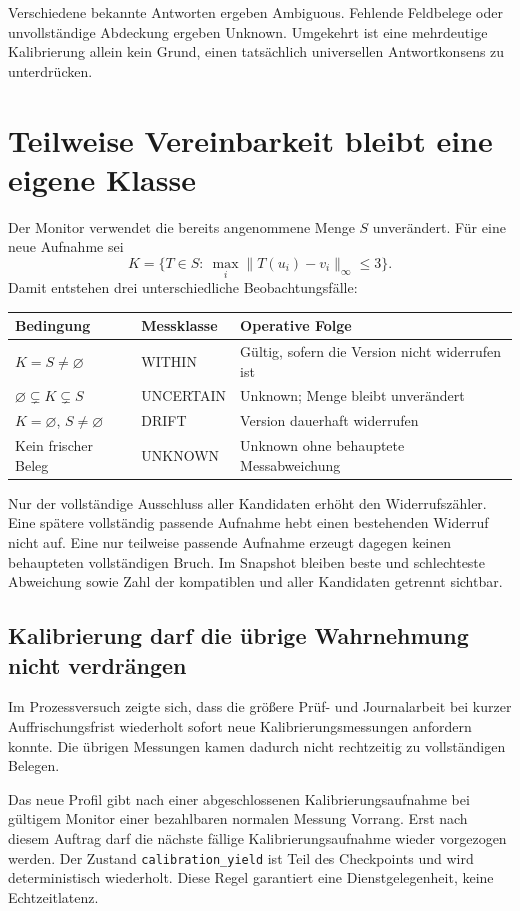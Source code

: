 \documentclass[11pt,a4paper]{article}
\newcommand{\nextsection}[2]{\clearpage{\color{accent}\small\textsf{#1}}\section{#2}}
\begin{document}
Verschiedene bekannte Antworten ergeben Ambiguous. Fehlende
Feldbelege oder unvollständige Abdeckung ergeben Unknown.
Umgekehrt ist eine mehrdeutige Kalibrierung allein kein Grund,
einen tatsächlich universellen Antwortkonsens zu unterdrücken.

\nextsection{64 / MONITOR UND MESSPLAN}{Teilweise Vereinbarkeit bleibt eine eigene Klasse}
Der Monitor verwendet die bereits angenommene Menge $S$ unverändert.
Für eine neue Aufnahme sei
\[
 K=\{T\in S:\ \max_i\|T(u_i)-v_i\|_\infty\leq3\}.
\]
Damit entstehen drei unterschiedliche Beobachtungsfälle:

\begin{tabularx}{\linewidth}{@{}l l Y@{}}
\toprule
Bedingung & Messklasse & Operative Folge\\\midrule
$K=S\ne\varnothing$ & WITHIN & Gültig, sofern die Version nicht widerrufen ist\\
$\varnothing\subsetneq K\subsetneq S$ & UNCERTAIN & Unknown; Menge bleibt unverändert\\
$K=\varnothing$, $S\ne\varnothing$ & DRIFT & Version dauerhaft widerrufen\\
Kein frischer Beleg & UNKNOWN & Unknown ohne behauptete Messabweichung\\
\bottomrule
\end{tabularx}


Nur der vollständige Ausschluss aller Kandidaten erhöht den
Widerrufszähler. Eine spätere vollständig passende Aufnahme hebt
einen bestehenden Widerruf nicht auf. Eine nur teilweise passende
Aufnahme erzeugt dagegen keinen behaupteten vollständigen Bruch.
Im Snapshot bleiben beste und schlechteste Abweichung sowie Zahl
der kompatiblen und aller Kandidaten getrennt sichtbar.

\subsection{Kalibrierung darf die übrige Wahrnehmung nicht verdrängen}
Im Prozessversuch zeigte sich, dass die größere Prüf- und
Journalarbeit bei kurzer Auffrischungsfrist wiederholt sofort
neue Kalibrierungsmessungen anfordern konnte. Die übrigen
Messungen kamen dadurch nicht rechtzeitig zu vollständigen Belegen.

Das neue Profil gibt nach einer abgeschlossenen Kalibrierungsaufnahme
bei gültigem Monitor einer bezahlbaren normalen Messung Vorrang.
Erst nach diesem Auftrag darf die nächste fällige Kalibrierungsaufnahme
wieder vorgezogen werden. Der Zustand \texttt{calibration\_yield}
ist Teil des Checkpoints und wird deterministisch wiederholt.
Diese Regel garantiert eine Dienstgelegenheit, keine Echtzeitlatenz.
\end{document}
